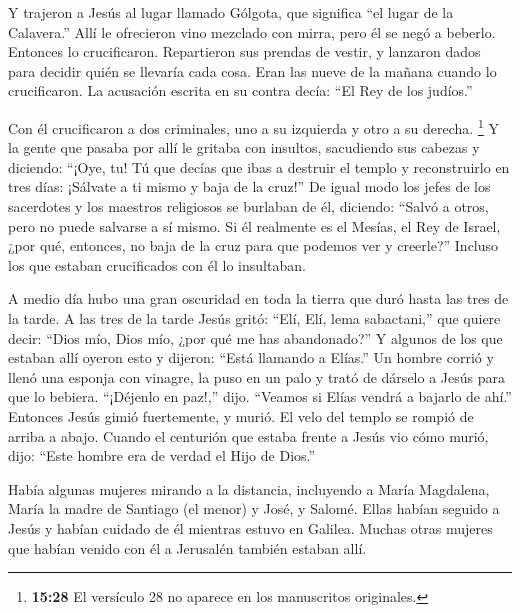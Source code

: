  Y trajeron a Jesús al lugar llamado Gólgota, que significa
``el lugar de la Calavera.''  Allí le ofrecieron vino
mezclado con mirra, pero él se negó a beberlo.  Entonces lo
crucificaron. Repartieron sus prendas de vestir, y lanzaron dados para
decidir quién se llevaría cada cosa.  Eran las nueve de la
mañana cuando lo crucificaron.  La acusación escrita en su
contra decía: ``El Rey de los judíos.''

 Con él crucificaron a dos criminales, uno a su izquierda y
otro a su derecha.  \footnote{\textbf{15:28} El versículo
  28 no aparece en los manuscritos originales.}  Y la gente
que pasaba por allí le gritaba con insultos, sacudiendo sus cabezas y
diciendo: ``¡Oye, tu! Tú que decías que ibas a destruir el templo y
reconstruirlo en tres días:  ¡Sálvate a ti mismo y baja de
la cruz!''  De igual modo los jefes de los sacerdotes y los
maestros religiosos se burlaban de él, diciendo: ``Salvó a otros, pero
no puede salvarse a sí mismo.  Si él realmente es el
Mesías, el Rey de Israel, ¿por qué, entonces, no baja de la cruz para
que podemos ver y creerle?'' Incluso los que estaban crucificados con él
lo insultaban.

 A medio día hubo una gran oscuridad en toda la tierra que
duró hasta las tres de la tarde.  A las tres de la tarde
Jesús gritó: ``Elí, Elí, lema sabactani,'' que quiere decir: ``Dios mío,
Dios mío, ¿por qué me has abandonado?''  Y algunos de los
que estaban allí oyeron esto y dijeron: ``Está llamando a Elías.''
 Un hombre corrió y llenó una esponja con vinagre, la puso
en un palo y trató de dárselo a Jesús para que lo bebiera. ``¡Déjenlo en
paz!,'' dijo. ``Veamos si Elías vendrá a bajarlo de ahí.'' 
Entonces Jesús gimió fuertemente, y murió.  El velo del
templo se rompió de arriba a abajo.  Cuando el centurión
que estaba frente a Jesús vio cómo murió, dijo: ``Este hombre era de
verdad el Hijo de Dios.''

 Había algunas mujeres mirando a la distancia, incluyendo a
María Magdalena, María la madre de Santiago (el menor) y José, y Salomé.
 Ellas habían seguido a Jesús y habían cuidado de él
mientras estuvo en Galilea. Muchas otras mujeres que habían venido con
él a Jerusalén también estaban allí.

